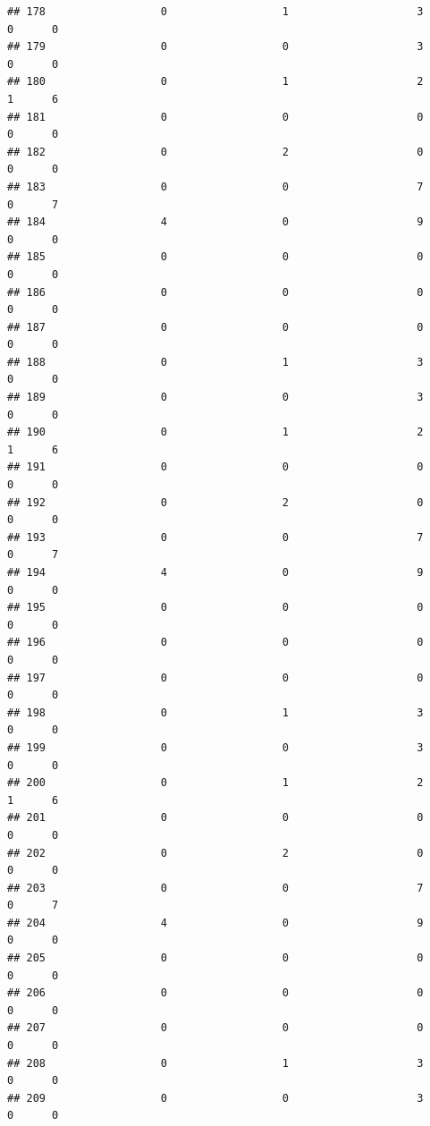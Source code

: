\documentclass[
]{article}
\begin{document}
\begin{verbatim}
## 178                  0                  1                    3        0      0
## 179                  0                  0                    3        0      0
## 180                  0                  1                    2        1      6
## 181                  0                  0                    0        0      0
## 182                  0                  2                    0        0      0
## 183                  0                  0                    7        0      7
## 184                  4                  0                    9        0      0
## 185                  0                  0                    0        0      0
## 186                  0                  0                    0        0      0
## 187                  0                  0                    0        0      0
## 188                  0                  1                    3        0      0
## 189                  0                  0                    3        0      0
## 190                  0                  1                    2        1      6
## 191                  0                  0                    0        0      0
## 192                  0                  2                    0        0      0
## 193                  0                  0                    7        0      7
## 194                  4                  0                    9        0      0
## 195                  0                  0                    0        0      0
## 196                  0                  0                    0        0      0
## 197                  0                  0                    0        0      0
## 198                  0                  1                    3        0      0
## 199                  0                  0                    3        0      0
## 200                  0                  1                    2        1      6
## 201                  0                  0                    0        0      0
## 202                  0                  2                    0        0      0
## 203                  0                  0                    7        0      7
## 204                  4                  0                    9        0      0
## 205                  0                  0                    0        0      0
## 206                  0                  0                    0        0      0
## 207                  0                  0                    0        0      0
## 208                  0                  1                    3        0      0
## 209                  0                  0                    3        0      0

\end{verbatim}
\end{document}
